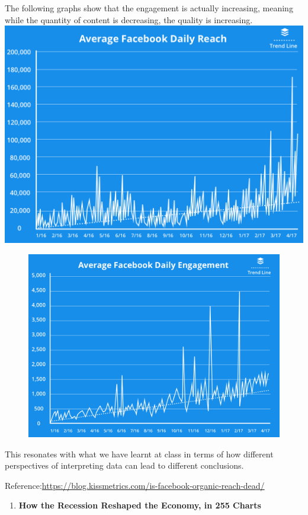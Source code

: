 \documentclass[]{book}
\providecommand{\tightlist}{%
  \setlength{\itemsep}{0pt}\setlength{\parskip}{0pt}}
\theoremstyle{definition}
\theoremstyle{definition}
\theoremstyle{definition}
\theoremstyle{remark}
\begin{document}
The following graphs show that the engagement is actually increasing,
meaning while the quantity of content is decreasing, the quality is
increasing. \includegraphics{images/average-facebook-reach.png}

\begin{figure}
\centering
\includegraphics{images/average-facebook-daily-reach.png}
\caption{}
\end{figure}

This resonates with what we have learnt at class in terms of how
different perspectives of interpreting data can lead to different
conclusions.

Reference:\url{https://blog.kissmetrics.com/is-facebook-organic-reach-dead/}

\begin{enumerate}
\def\labelenumi{\arabic{enumi}.}
\setcounter{enumi}{15}
\tightlist
\item
  \textbf{How the Recession Reshaped the Economy, in 255 Charts}
\end{enumerate}
\end{document}
